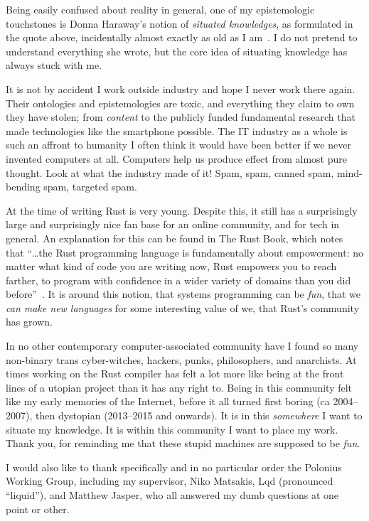 \documentclass[11pt,a4paper,twoside,openany]{report}
\begin{document}
{\footnotesize

  Being easily confused about reality in general, one of my epistemologic
  touchstones is Donna Haraway's notion of \textit{situated knowledges}, as
  formulated in the quote above, incidentally almost exactly as old as I
  am~\cite{haraway}. I do not pretend to understand everything she wrote, but
  the core idea of situating knowledge has always stuck with me.

  It is not by accident I work outside industry and hope I never work there
  again. Their ontologies and epistemologies are toxic, and everything they
  claim to own they have stolen; from \emph{content} to the publicly
  funded fundamental research that made technologies like the smartphone
  possible. The IT industry as a whole is such an affront to humanity I often
  think it would have been better if we never invented computers at all.
  Computers help us produce effect from almost pure thought. Look at what the
  industry made of it! Spam, spam, canned spam, mind-bending spam, targeted
  spam.

  At the time of writing Rust is very young. Despite this, it still has a
  surprisingly large and surprisingly nice fan base for an online community, and
  for tech in general. An explanation for this can be found in The Rust Book,
  which notes that ``\ldots{}the Rust programming language is fundamentally
  about empowerment: no matter what kind of code you are writing now, Rust
  empowers you to reach farther, to program with confidence in a wider variety
  of domains than you did before''~\cite{nichols_rust_nodate}. It is around this
  notion, that systems programming can be \emph{fun}, that we \emph{can make new
    languages} for some interesting value of we, that Rust's community has
  grown.

  In no other contemporary computer-associated community have I found so many
  non-binary trans cyber-witches, hackers, punks, philosophers, and anarchists.
  At times working on the Rust compiler has felt a lot more like being at the
  front lines of a utopian project than it has any right to. Being in this
  community felt like my early memories of the Internet, before it all turned
  first boring (ca 2004--2007), then dystopian (2013--2015 and onwards). It is
  in this \textit{somewhere} I want to situate my knowledge. It is within this
  community I want to place my work. Thank you, for reminding me that these
  stupid machines are supposed to be \emph{fun}.

  I would also like to thank specifically and in no particular order the
  Polonius Working Group, including my supervisor, Niko Matsakis, Lqd
  (pronounced ``liquid''), and Matthew Jasper, who all answered my dumb
  questions at one point or other.

}
\end{document}
